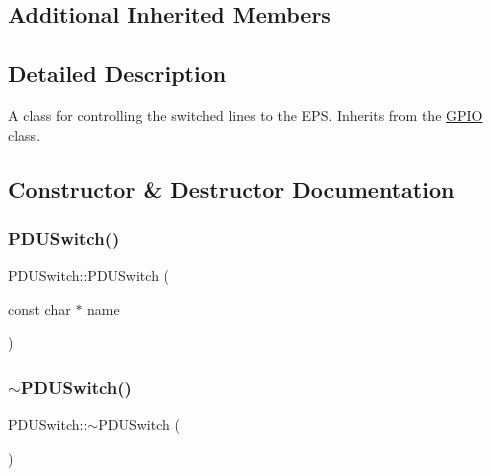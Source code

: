 \subsection*{Additional Inherited Members}


\subsection{Detailed Description}
A class for controlling the switched lines to the E\+PS. Inherits from the \hyperlink{classcubesat_1_1GPIO}{G\+P\+IO} class. 

\subsection{Constructor \& Destructor Documentation}
\mbox{\label{classcubesat_1_1PDUSwitch_a025fa4903a5ae0044948a1c0dc608674}} 
\subsubsection{\texorpdfstring{P\+D\+U\+Switch()}{PDUSwitch()}}
{\footnotesize\ttfamily P\+D\+U\+Switch\+::\+P\+D\+U\+Switch (\begin{DoxyParamCaption}\item[{const char $\ast$}]{name }\end{DoxyParamCaption})}

\mbox{\label{classcubesat_1_1PDUSwitch_a793dcaa10a20d99985d60d5f432fcbb7}} 
\subsubsection{\texorpdfstring{$\sim$\+P\+D\+U\+Switch()}{~PDUSwitch()}}
{\footnotesize\ttfamily P\+D\+U\+Switch\+::$\sim$\+P\+D\+U\+Switch (\begin{DoxyParamCaption}{ }\end{DoxyParamCaption})\hspace{0.3cm}{\ttfamily [virtual]}}



